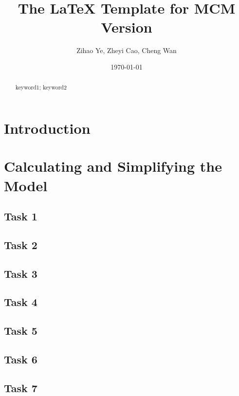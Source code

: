 \documentclass{mcmthesis}
\title{The \LaTeX{} Template for MCM Version \MCMversion}
\author{\small Zihao Ye, Zheyi Cao, Cheng Wan}
\date{\today}
\begin{document}
\begin{abstract}
\lipsum[1]
\begin{keywords}
keyword1; keyword2
\end{keywords}
\end{abstract}
\maketitle
\section{Introduction}

  
\section{Calculating and Simplifying the Model}
\subsection{Task 1}


\subsection{Task 2}


\subsection{Task 3}


\subsection{Task 4}


\subsection{Task 5}



\subsection{Task 6}



\subsection{Task 7}
\end{document}
